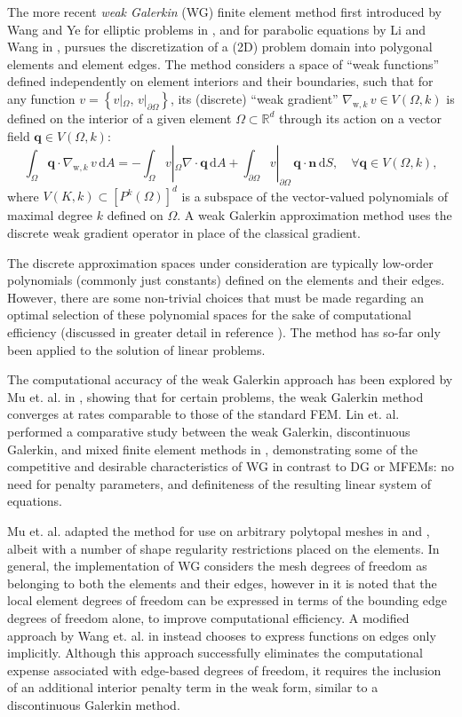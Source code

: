 		The more recent \textit{weak Galerkin} (WG) finite element method first introduced by Wang and Ye for elliptic problems in \cite{Wang:13}, and for parabolic equations by Li and Wang in \cite{Li:13}, pursues the discretization of a (2D) problem domain into polygonal elements and element edges. The method considers a space of ``weak functions'' defined independently on element interiors and their boundaries, such that for any function $v = \left\{ v|_\Omega, \, v|_{\partial \Omega} \right\}$, its (discrete) ``weak gradient'' $\nabla_{\mathrm w,k} \, v \in V(\Omega,k)$ is defined on the interior of a given element $\Omega \subset \mathbb{R}^d$ through its action on a vector field $\bm{q} \in V(\Omega,k)$:
\begin{equation}
	\int_\Omega \bm{q} \cdot \nabla_{\mathrm w,k} \, v \, \mathrm dA = - \int_\Omega v|_\Omega \nabla \cdot \bm{q} \, \mathrm dA + \int_{\partial \Omega} v|_{\partial \Omega} \, \bm{q} \cdot \bm{n} \, \mathrm dS, \quad \forall \bm{q} \in V(\Omega,k),
\end{equation}
where $V(K,k) \subset \left[ P^k (\Omega) \right]^d$ is a subspace of the vector-valued polynomials of maximal degree $k$ defined on $\Omega$. A weak Galerkin approximation method uses the discrete weak gradient operator in place of the classical gradient.

	The discrete approximation spaces under consideration are typically low-order polynomials (commonly just constants) defined on the elements and their edges. However, there are some non-trivial choices that must be made regarding an optimal selection of these polynomial spaces for the sake of computational efficiency (discussed in greater detail in reference \cite{Mu:15:1}). The method has so-far only been applied to the solution of linear problems.

	The computational accuracy of the weak Galerkin approach has been explored by Mu et. al. in \cite{Mu:13}, showing that for certain problems, the weak Galerkin method converges at rates comparable to those of the standard FEM. Lin et. al. performed a comparative study between the weak Galerkin, discontinuous Galerkin, and mixed finite element methods in \cite{Lin:15}, demonstrating some of the competitive and desirable characteristics of WG in contrast to DG or MFEMs: no need for penalty parameters, and definiteness of the resulting linear system of equations.

	Mu et. al. adapted the method for use on arbitrary polytopal meshes in \cite{Mu:15:2} and \cite{Mu:15:1}, albeit with a number of shape regularity restrictions placed on the elements. In general, the implementation of WG considers the mesh degrees of freedom as belonging to both the elements and their edges, however in \cite{Mu:15:1} it is noted that the local element degrees of freedom can be expressed in terms of the bounding edge degrees of freedom alone, to improve computational efficiency. A modified approach by Wang et. al. in \cite{Wang:14} instead chooses to express functions on edges only implicitly. Although this approach successfully eliminates the computational expense associated with edge-based degrees of freedom, it requires the inclusion of an additional interior penalty term in the weak form, similar to a discontinuous Galerkin method.

